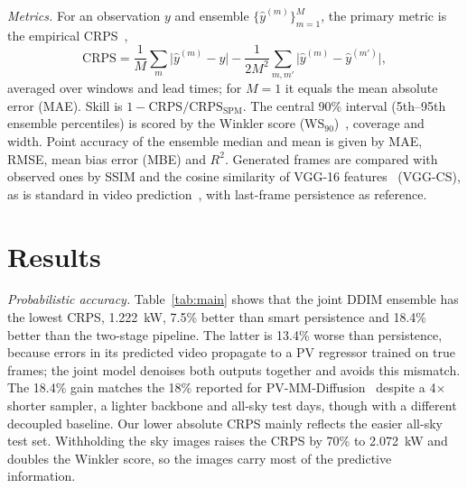 \documentclass[conference]{IEEEtran}
\newcommand{\ddimcrps}{1.222}
\begin{document}
\textit{Metrics.} For an observation $y$ and ensemble $\{\hat y^{(m)}\}_{m=1}^M$, the primary metric is the empirical
CRPS~\cite{lauret2019verification},
\begin{equation}
  \mathrm{CRPS}=\frac1M\sum_{m}\big|\hat y^{(m)}-y\big|-\frac{1}{2M^2}\sum_{m,m'}\big|\hat y^{(m)}-\hat y^{(m')}\big|,
\end{equation}
averaged over windows and lead times; for $M=1$ it equals the mean absolute error (MAE). Skill is
$1-\mathrm{CRPS}/\mathrm{CRPS}_{\mathrm{SPM}}$. The central 90\% interval (5th--95th ensemble percentiles) is scored
by the Winkler score (WS$_{90}$)~\cite{vandermeer2018review}, coverage and width. Point accuracy of the ensemble median
and mean is given by MAE, RMSE, mean bias error (MBE) and $R^2$. Generated frames are compared with observed ones by
SSIM and the cosine similarity of VGG-16 features~\cite{simonyan2015vgg} (VGG-CS), as is standard in video
prediction~\cite{lee2018savp}, with last-frame persistence as reference.

\section{Results}
\textit{Probabilistic accuracy.} Table~\ref{tab:main} shows that the joint DDIM ensemble has the lowest CRPS,
\SI{\ddimcrps}{kW}, 7.5\% better than smart persistence and 18.4\% better than the two-stage pipeline. The latter is
13.4\% worse than persistence, because errors in its predicted video propagate to a PV regressor trained on true
frames; the joint model denoises both outputs together and avoids this mismatch. The 18.4\% gain matches the 18\%
reported for PV-MM-Diffusion~\cite{huang2026pvmm} despite a 4$\times$ shorter sampler, a lighter backbone and all-sky
test days, though with a different decoupled baseline. Our lower absolute CRPS mainly reflects the easier all-sky
test set. Withholding the sky images raises the CRPS by 70\% to \SI{2.072}{kW} and doubles the Winkler score, so the
images carry most of the predictive information.
\end{document}
